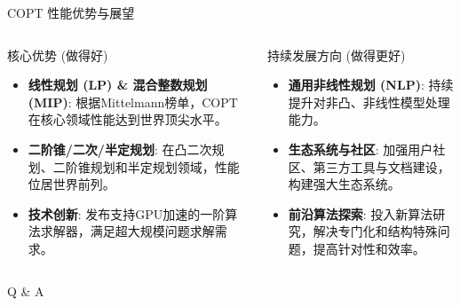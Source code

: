 \documentclass[10pt]{beamer}
\begin{document}
\begin{frame}[allowframebreaks]{COPT 性能优势与展望}
  \begin{columns}[T,onlytextwidth]
      \begin{alertblock}{核心优势 (做得好)}
        \begin{itemize}
          \item \textbf{线性规划 (LP) \& 混合整数规划 (MIP)}: 根据Mittelmann榜单，COPT在核心领域性能达到世界顶尖水平。
          \item \textbf{二阶锥/二次/半定规划}: 在凸二次规划、二阶锥规划和半定规划领域，性能位居世界前列。
          \item \textbf{技术创新}: 发布支持GPU加速的一阶算法求解器，满足超大规模问题求解需求。
        \end{itemize}
      \end{alertblock}
      \begin{block}{持续发展方向 (做得更好)}
        \begin{itemize}
          \item \textbf{通用非线性规划 (NLP)}: 持续提升对非凸、非线性模型处理能力。
          \item \textbf{生态系统与社区}: 加强用户社区、第三方工具与文档建设，构建强大生态系统。
          \item \textbf{前沿算法探索}: 投入新算法研究，解决专门化和结构特殊问题，提高针对性和效率。
        \end{itemize}
      \end{block}
  \end{columns}
\end{frame}



{
\begin{frame}[standout]
  Q \& A
\end{frame}
}
\end{document}
